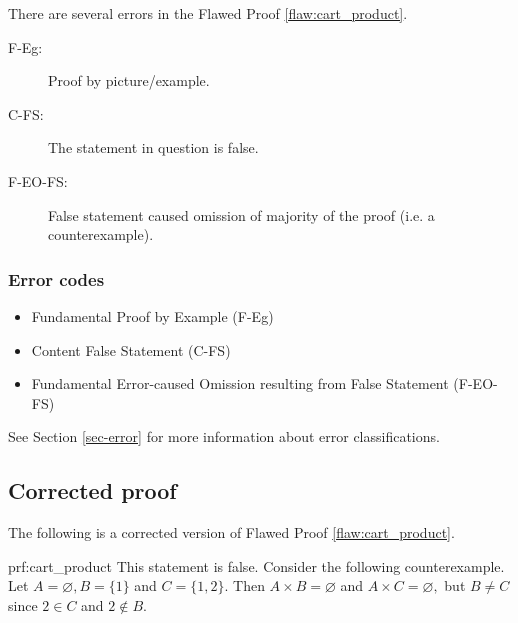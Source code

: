 
There are several errors
 in the Flawed Proof \ref{flaw:cart_product}. %

 
 \begin{description}
 	\item[F-Eg:] Proof by picture/example.
 	\item[C-FS:] The statement in question is false.
 	\item[F-EO-FS:] False statement caused omission of majority of the proof (i.e. a counterexample).
 \end{description}

 
\subsubsection{Error codes}
\begin{itemize}
	\item 	Fundamental Proof by Example (F-Eg)
	\item   Content False Statement (C-FS)
	\item   Fundamental Error-caused Omission resulting from False Statement (F-EO-FS)
\end{itemize}
See Section \ref{sec-error} for more information about error classifications.

\clearpage
\subsection{Corrected proof}

The following is a corrected version of Flawed Proof \ref{flaw:cart_product}. %

\begin{prf}{prf:cart_product} %
This statement is false. Consider the following counterexample. Let $A = \varnothing, B = \{1\}$ and $C=\{1,2\}.$ Then $A \times B = \varnothing$ and $A \times C = \varnothing,$ but $B \neq C$ since $2 \in C$  and $2 \notin B.$
\end{prf}